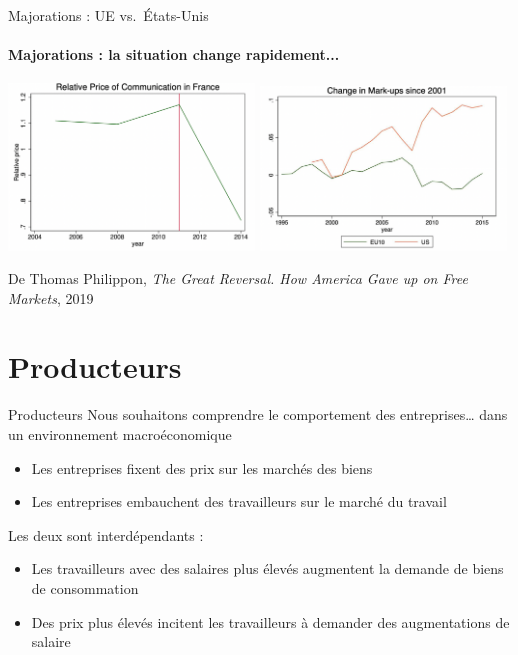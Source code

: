 \documentclass[
  ignorenonframetext,
  aspectratio=169,
]{beamer}
\providecommand{\tightlist}{%
  \setlength{\itemsep}{0pt}\setlength{\parskip}{0pt}}\usepackage{longtable,booktabs,array}
\begin{document}
\begin{frame}{Majorations : UE vs.~États-Unis}
\label{majorations-ue-vs.-uxe9tats-unis}
\framesubtitle{Majorations : la situation change rapidement...}

\includegraphics[width=0.49\textwidth,height=\textheight]{assets/philipon_telecoms.png}
\includegraphics[width=0.49\textwidth,height=\textheight]{assets/philipon_markups.png}

De Thomas Philippon, \emph{The Great Reversal. How America Gave up on
Free Markets}, 2019
\end{frame}

\section{Producteurs}\label{producteurs}

\begin{frame}{Producteurs}
Nous souhaitons comprendre le comportement des entreprises\ldots{} dans
un environnement macroéconomique

\begin{itemize}
\tightlist
\item
  Les entreprises fixent des prix sur les marchés des biens
\item
  Les entreprises embauchent des travailleurs sur le marché du travail
\end{itemize}

Les deux sont interdépendants :

\begin{itemize}
\tightlist
\item
  Les travailleurs avec des salaires plus élevés augmentent la demande
  de biens de consommation
\item
  Des prix plus élevés incitent les travailleurs à demander des
  augmentations de salaire
\end{itemize}
\end{frame}
\end{document}
